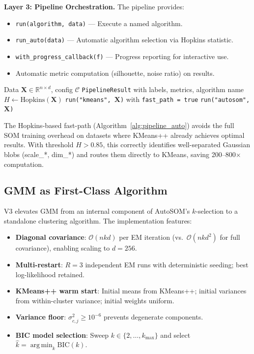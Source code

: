 \documentclass[journal]{IEEEtran}
\DeclareMathOperator*{\argmin}{arg\,min}
\begin{document}
\textbf{Layer 3: Pipeline Orchestration.} The pipeline provides:
\begin{itemize}
  \item \texttt{run(algorithm, data)} --- Execute a named algorithm.
  \item \texttt{run\_auto(data)} --- Automatic algorithm selection via Hopkins statistic.
  \item \texttt{with\_progress\_callback(f)} --- Progress reporting for interactive use.
  \item Automatic metric computation (silhouette, noise ratio) on results.
\end{itemize}

\begin{algorithm}
\caption{ClusteringPipeline.run\_auto}
\label{alg:pipeline_auto}
\begin{algorithmic}[1]
\Require Data $\mathbf{X} \in \mathbb{R}^{n \times d}$, config $\mathcal{C}$
\Ensure  \texttt{PipelineResult} with labels, metrics, algorithm name
\State $H \leftarrow \text{Hopkins}(\mathbf{X})$ 
  \State \Return \texttt{run("kmeans", $\mathbf{X}$)} with \texttt{fast\_path = true}
\Else
  \State \Return \texttt{run("autosom", $\mathbf{X}$)}
\EndIf
\end{algorithmic}
\end{algorithm}

The Hopkins-based fast-path (Algorithm~\ref{alg:pipeline_auto}) avoids the full SOM training overhead on datasets where KMeans++ already achieves optimal results. With threshold $H > 0.85$, this correctly identifies well-separated Gaussian blobs (scale\_*, dim\_*) and routes them directly to KMeans, saving 200--800$\times$ computation.

\subsection{GMM as First-Class Algorithm}

V3 elevates GMM from an internal component of AutoSOM's $k$-selection to a standalone clustering algorithm. The implementation features:

\begin{itemize}
  \item \textbf{Diagonal covariance}: $\mathcal{O}(nkd)$ per EM iteration (vs.\ $\mathcal{O}(nkd^2)$ for full covariance), enabling scaling to $d=256$.
  \item \textbf{Multi-restart}: $R=3$ independent EM runs with deterministic seeding; best log-likelihood retained.
  \item \textbf{KMeans++ warm start}: Initial means from KMeans++; initial variances from within-cluster variance; initial weights uniform.
  \item \textbf{Variance floor}: $\sigma^2_{c,j} \ge 10^{-6}$ prevents degenerate components.
  \item \textbf{BIC model selection}: Sweep $k \in \{2, \ldots, k_{\max}\}$ and select $\hat{k} = \argmin_k \mathrm{BIC}(k)$.
\end{itemize}
\end{document}
